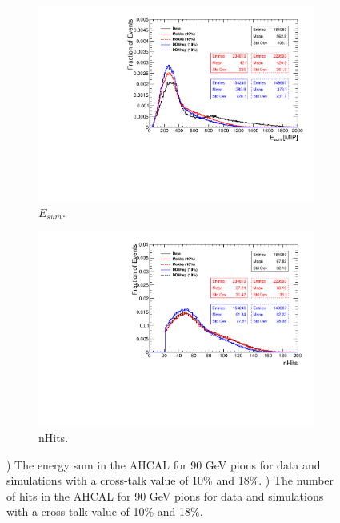 \begin{figure}[htbp!]
  \centering
  \begin{subfigure}[t]{0.49\textwidth}
    \includegraphics[width=1.\linewidth]{../Thesis_Plots/Timing/Pions/Plots/Comparison_EnergySum_Xtalk_pions90GeV.pdf}
    \caption{$E_{sum}$.} \label{fig:pi90Evis}
  \end{subfigure}
  \hfill
  \begin{subfigure}[t]{0.49\textwidth}
    \includegraphics[width=1.\linewidth]{../Thesis_Plots/Timing/Pions/Plots/Comparison_nHits_Xtalk_pions90GeV.pdf}
    \caption{nHits.} \label{fig:pi90nHits}
  \end{subfigure}
  \caption{) The energy sum in the AHCAL for 90 GeV pions for data and simulations with a cross-talk value of 10\% and 18\%. ) The number of hits in the AHCAL for 90 GeV pions for data and simulations with a cross-talk value of 10\% and 18\%.}
  \label{fig:pi90Val}
\end{figure}

